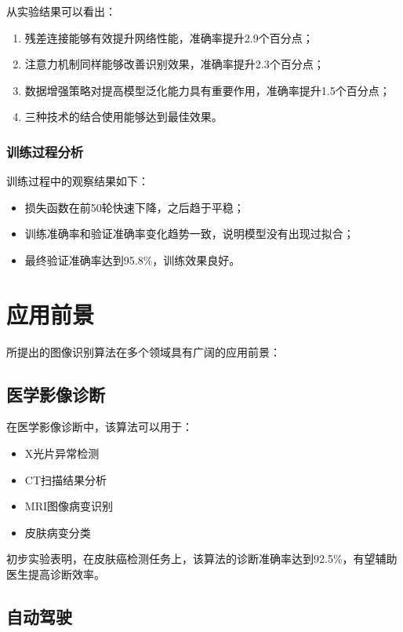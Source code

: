 \documentclass[a4paper,12pt]{article}
\begin{document}
从实验结果可以看出：
\begin{enumerate}
    \item 残差连接能够有效提升网络性能，准确率提升2.9个百分点；
    \item 注意力机制同样能够改善识别效果，准确率提升2.3个百分点；
    \item 数据增强策略对提高模型泛化能力具有重要作用，准确率提升1.5个百分点；
    \item 三种技术的结合使用能够达到最佳效果。
\end{enumerate}

\subsubsection{训练过程分析}

训练过程中的观察结果如下：
\begin{itemize}
    \item 损失函数在前50轮快速下降，之后趋于平稳；
    \item 训练准确率和验证准确率变化趋势一致，说明模型没有出现过拟合；
    \item 最终验证准确率达到95.8\%，训练效果良好。
\end{itemize}

\section{应用前景}

所提出的图像识别算法在多个领域具有广阔的应用前景：

\subsection{医学影像诊断}

在医学影像诊断中，该算法可以用于：
\begin{itemize}
    \item X光片异常检测
    \item CT扫描结果分析
    \item MRI图像病变识别
    \item 皮肤病变分类
\end{itemize}

初步实验表明，在皮肤癌检测任务上，该算法的诊断准确率达到92.5\%，有望辅助医生提高诊断效率。

\subsection{自动驾驶}
\end{document}
